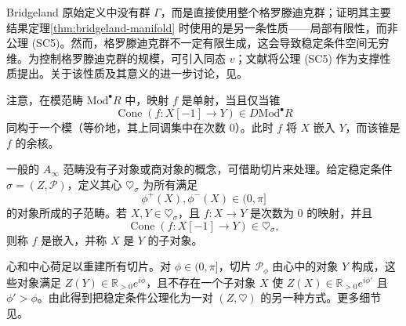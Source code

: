 \begin{note}[支撑性质]
Bridgeland 原始定义中没有群 $\Gamma$，而是直接使用整个格罗滕迪克群；证明其主要结果定理\ref{thm:bridgeland-manifold} 时使用的是另一条性质——局部有限性，而非公理 (SC5)。然而，格罗滕迪克群不一定有限生成，这会导致稳定条件空间无穷维。为控制格罗滕迪克群的规模，可引入同态 $v$；文献将公理 (SC5) 作为支撑性质提出。关于该性质及其意义的进一步讨论，见。
\end{note}

\begin{note}[心与子对象]
注意，在模范畴 $\mathrm{Mod}^{\bullet}R$ 中，映射 $f$ 是单射，当且仅当锥
\[
  \operatorname{Cone}(f\colon X[-1]\to Y)\in D\mathrm{Mod}^{\bullet}R
\]
同构于一个模（等价地，其上同调集中在次数 $0$）。此时 $f$ 将 $X$ 嵌入 $Y$，而该锥是 $f$ 的余核。

一般的 $A_\infty$ 范畴没有子对象或商对象的概念，可借助切片来处理。给定稳定条件 $\sigma=(Z,\mathcal P)$，定义其心 $\heartsuit_\sigma$ 为所有满足
\[
  \phi^+(X),\phi^-(X)\in(0,\pi]
\]
的对象所成的子范畴。若 $X,Y\in\heartsuit_\sigma$，且 $f\colon X\to Y$ 是次数为 $0$ 的映射，并且
\[
  \operatorname{Cone}(f\colon X[-1]\to Y)\in\heartsuit_\sigma,
\]
则称 $f$ 是嵌入，并称 $X$ 是 $Y$ 的子对象。

心和中心荷足以重建所有切片。对 $\phi\in(0,\pi]$，切片 $\mathcal P_\phi$ 由心中的对象 $Y$ 构成，这些对象满足 $Z(Y)\in\mathbb R_{>0}e^{i\phi}$，且不存在一个子对象 $X$ 使 $Z(X)\in\mathbb R_{>0}e^{i\phi'}$ 且 $\phi'>\phi$。由此得到把稳定条件公理化为一对 $(Z,\heartsuit)$ 的另一种方式。更多细节见。
\end{note}

